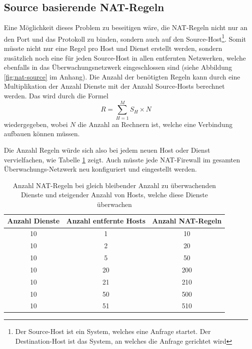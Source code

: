 \subsection{Source basierende NAT-Regeln} \label{sec:theorie-nat-src} 
Eine M\"oglichkeit dieses Problem zu beseitigen w\"are, die NAT-Regeln nicht nur an den Port und das Protokoll zu binden, sondern auch auf den Source-Host\footnote{\label{foot:theorie-sourcehost}Der Source-Host ist ein System, welches eine Anfrage startet. Der Destination-Host ist das System, an welches die Anfrage gerichtet wird}. Somit m\"usste nicht nur eine Regel pro Host und Dienst erstellt werden, sondern zus\"atzlich noch eine f\"ur jeden Source-Host in allen entfernten Netzwerken, welche ebenfalls in das \"Uberwachungsnetzwerk eingeschlossen sind (siehe Abbildung \ref{fig:nat-source} im Anhang). Die Anzahl der ben\"otigten Regeln kann durch eine Multiplikation der Anzahl Dienste mit der Anzahl Source-Hosts berechnet werden. Das wird durch die Formel
\begin{equation}
 R = \sum_{H=1}^{M} {S_H \times N}
\label{eq:theorie-nat-sec}
\end{equation}
wiedergegeben, wobei $N$ die Anzahl an Rechnern ist, welche eine Verbindung aufbauen k\"onnen m\"ussen.

Die Anzahl Regeln w\"urde sich also bei jedem neuen Host oder Dienst vervielfachen, wie Tabelle \ref{tbl:theorie-nat} zeigt. Auch m\"usste jede NAT-Firewall im gesamten \"Uberwachungs-Netzwerk neu konfiguriert und eingestellt werden.

\begin{table}[ht]
\centering
\begin{tabular}{ccc}
 \toprule
 Anzahl Dienste & Anzahl entfernte Hosts & Anzahl NAT-Regeln\\
 \midrule
 10 & 1 & 10\\
 10 & 2 & 20\\
 10 & 5 & 50\\
 10 & 20 & 200\\
 10 & 21 & 210\\
 10 & 50 & 500\\
 10 & 51 & 510\\
 \bottomrule
\end{tabular}
\caption[Anzahl NAT-Regeln bei vielen Diensten]{Anzahl NAT-Regeln bei gleich bleibender Anzahl zu \"uberwachenden Dienste und steigender Anzahl von Hosts, welche diese Dienste \"uberwachen}
\label{tbl:theorie-nat}
\end{table}


